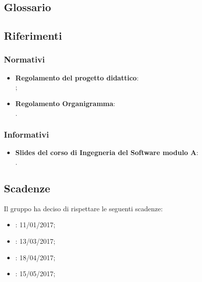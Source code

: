 \subsection{Glossario}
\descrizioneGlossario

\subsection{Riferimenti}
\subsubsection{Normativi}
\riferimentiNormativi
	\begin{itemize}
		\item \textbf{Regolamento del progetto didattico}:\\
		;
		\item \textbf{Regolamento Organigramma}:\\
		.
	\end{itemize}

\subsubsection{Informativi}
	\begin{itemize}
		\item \textbf{Slides del corso di Ingegneria del Software modulo A}:\\
		.
	\end{itemize}




\subsection{Scadenze}
Il gruppo \gruppo ha deciso di rispettare le seguenti scadenze:
\begin{itemize}
	\item \textbf{\RR}: 11/01/2017;
	\item \textbf{\RP}: 13/03/2017;
	\item \textbf{\RQ}: 18/04/2017;
	\item \textbf{\RA}: 15/05/2017;
\end{itemize}